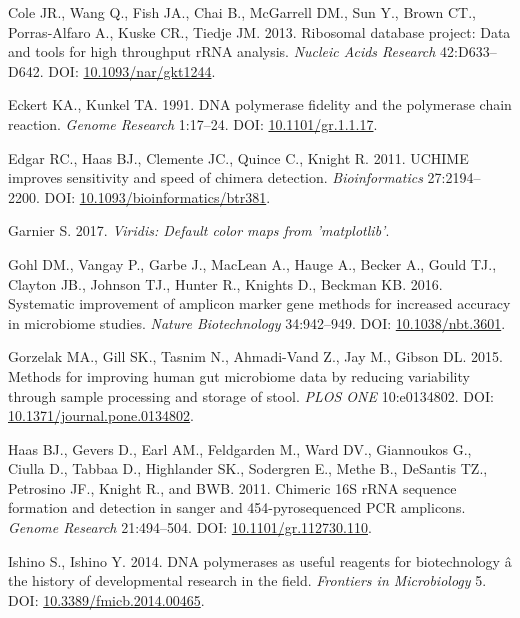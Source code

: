 \documentclass[12pt,]{article}
\begin{document}
\hypertarget{ref-rdp_Cole_2013}{}
Cole JR., Wang Q., Fish JA., Chai B., McGarrell DM., Sun Y., Brown CT.,
Porras-Alfaro A., Kuske CR., Tiedje JM. 2013. Ribosomal database
project: Data and tools for high throughput rRNA analysis. \emph{Nucleic
Acids Research} 42:D633--D642. DOI:
\href{https://doi.org/10.1093/nar/gkt1244}{10.1093/nar/gkt1244}.

\hypertarget{ref-Eckert1991}{}
Eckert KA., Kunkel TA. 1991. DNA polymerase fidelity and the polymerase
chain reaction. \emph{Genome Research} 1:17--24. DOI:
\href{https://doi.org/10.1101/gr.1.1.17}{10.1101/gr.1.1.17}.

\hypertarget{ref-uchime_Edgar_2011}{}
Edgar RC., Haas BJ., Clemente JC., Quince C., Knight R. 2011. UCHIME
improves sensitivity and speed of chimera detection.
\emph{Bioinformatics} 27:2194--2200. DOI:
\href{https://doi.org/10.1093/bioinformatics/btr381}{10.1093/bioinformatics/btr381}.

\hypertarget{ref-viridis_citation_2017}{}
Garnier S. 2017. \emph{Viridis: Default color maps from 'matplotlib'}.

\hypertarget{ref-taq_Gohl_2016}{}
Gohl DM., Vangay P., Garbe J., MacLean A., Hauge A., Becker A., Gould
TJ., Clayton JB., Johnson TJ., Hunter R., Knights D., Beckman KB. 2016.
Systematic improvement of amplicon marker gene methods for increased
accuracy in microbiome studies. \emph{Nature Biotechnology} 34:942--949.
DOI: \href{https://doi.org/10.1038/nbt.3601}{10.1038/nbt.3601}.

\hypertarget{ref-Gorzelak2015}{}
Gorzelak MA., Gill SK., Tasnim N., Ahmadi-Vand Z., Jay M., Gibson DL.
2015. Methods for improving human gut microbiome data by reducing
variability through sample processing and storage of stool. \emph{PLOS
ONE} 10:e0134802. DOI:
\href{https://doi.org/10.1371/journal.pone.0134802}{10.1371/journal.pone.0134802}.

\hypertarget{ref-Haas2011}{}
Haas BJ., Gevers D., Earl AM., Feldgarden M., Ward DV., Giannoukos G.,
Ciulla D., Tabbaa D., Highlander SK., Sodergren E., Methe B., DeSantis
TZ., Petrosino JF., Knight R., and BWB. 2011. Chimeric 16S rRNA sequence
formation and detection in sanger and 454-pyrosequenced PCR amplicons.
\emph{Genome Research} 21:494--504. DOI:
\href{https://doi.org/10.1101/gr.112730.110}{10.1101/gr.112730.110}.

\hypertarget{ref-polymerase_Ishino_2014}{}
Ishino S., Ishino Y. 2014. DNA polymerases as useful reagents for
biotechnology â the history of developmental research in the field.
\emph{Frontiers in Microbiology} 5. DOI:
\href{https://doi.org/10.3389/fmicb.2014.00465}{10.3389/fmicb.2014.00465}.
\end{document}
